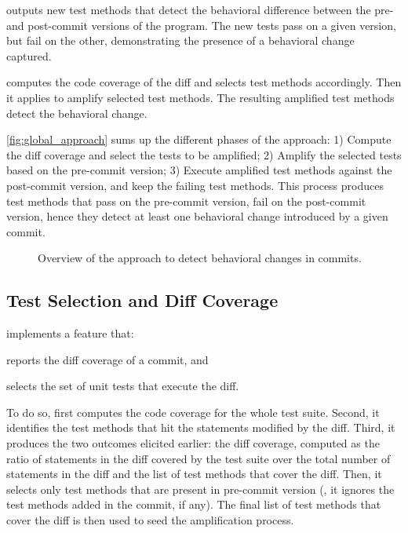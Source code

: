 \DCI outputs new test methods that detect the behavioral difference between the pre- and post-commit versions of the program.
The new tests pass on a given version, but fail on the other, demonstrating the presence of a behavioral change captured.

\DCI computes the code coverage of the diff and selects test methods accordingly.
Then it applies \dspot to amplify selected test methods.
The resulting amplified test methods detect the behavioral change.

\autoref{fig:global_approach} sums up the different phases of the approach:
1) Compute the diff coverage and select the tests to be amplified;
2) Amplify the selected tests based on the pre-commit version;
3) Execute amplified test methods against the post-commit version, and keep the failing test methods.
This process produces test methods that pass on the pre-commit version, fail on the post-commit version, hence they detect at least one behavioral change introduced by a given commit.

\begin{figure}
    \caption{Overview of the approach to detect behavioral changes in commits.}
    \label{fig:global_approach}
\end{figure}

\subsection{Test Selection and Diff Coverage}
\label{subsec:compute_diff_coverage}
\DCI implements a feature that:
\begin{enumerate*}
\item reports the diff coverage of a commit, and
\item selects the set of unit tests that execute the diff.
\end{enumerate*}
%
To do so, \DCI first computes the code coverage for the whole test suite.
Second, it identifies the test methods that hit the statements modified by the diff. 
Third, it produces the two outcomes elicited earlier: the diff coverage, computed as the ratio of statements in the diff covered by the test suite over the total number of statements in the diff and the list of test methods that cover the diff.
%
Then, it selects only test methods that are present in pre-commit version (\ie, it ignores the test methods added in the commit, if any).
The final list of test methods that cover the diff is then used to seed the amplification process.

